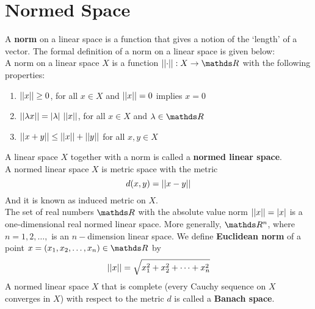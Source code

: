 \documentclass[../main-sheet.tex]{subfiles}
\begin{document}
\section{Normed Space}
A \textbf{norm} on a linear space is a function that gives a notion of the `length' of a vector. The formal definition of a norm on a linear space is given below:\\
A norm on a linear space \(X\) is a function \(\norm{\cdot}:X\to\R\) with the following properties:
\begin{enumerate}
    \item \(\left\vert\left\vert x\right\vert\right\vert\geq 0\), for all \(x\in X\) and \(\left\vert\left\vert x\right\vert\right\vert=0\) implies \(x=0\)
    \item \(\left\vert\left\vert\lambda x\right\vert\right\vert=\left\vert\lambda\right\vert\,\left\vert\left\vert x\right\vert\right\vert\), for all \(x\in X\) and \(\lambda \in \R\)
    \item \(\left\vert\left\vert x+y\right\vert\right\vert\leq \left\vert\left\vert x\right\vert\right\vert+\left\vert\left\vert y\right\vert\right\vert\) for all \(x,y\in X\)
\end{enumerate}
A linear space \(X\) together with a norm is called a \textbf{normed linear space}.\\
A normed linear space \(X\) is metric space with the metric
\[d(x,y)=\left\vert\left\vert x-y\right\vert\right\vert\]
And it is known as induced metric on \(X\).\\
The set of real numbers \(\R\) with the absolute value norm \(\left\vert\left\vert x\right\vert\right\vert=\left\vert x\right\vert\) is a one-dimensional real normed linear space. More generally, \(\R^n\), where \(n=1,2,\dots,\) is an \(n-\)dimension linear space. We define \textbf{Euclidean norm} of a point \(x=(x_1,x_2,\dots,x_n)\in \R\) by 
\[\left\vert\left\vert x\right\vert\right\vert=\sqrt{x_1^2+x_2^2+\dots+x_n^2}\]
A normed linear space \(X\) that is complete (every Cauchy sequence on \(X\) converges in \(X\)) with respect to the metric \(d\) is called a \textbf{Banach space}.
\end{document}
